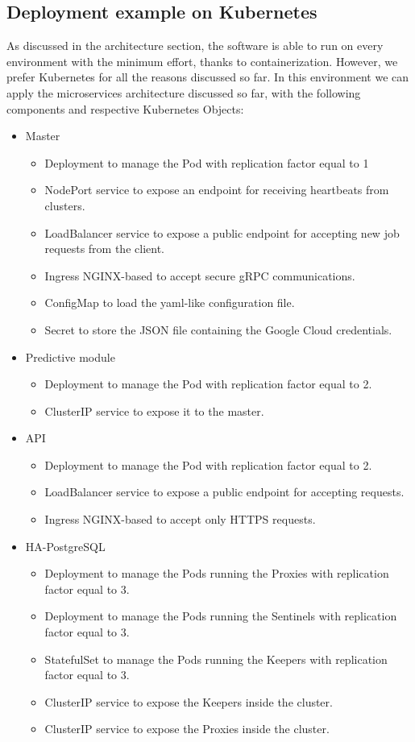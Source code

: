 \documentclass[12pt,twoside,cucitura]{toptesi}
\begin{document}
\subsection{Deployment example on Kubernetes}
As discussed in the architecture section, the software is able to run on every environment with the minimum effort, thanks to containerization. However, we prefer Kubernetes for all the reasons discussed so far. In this environment we can apply the microservices architecture discussed so far, with the following components and respective Kubernetes Objects:
\begin{itemize}
  \item Master
  \begin{itemize}
  	\item Deployment to manage the Pod with replication factor equal to 1
  	\item NodePort service to expose an endpoint for receiving heartbeats from clusters.
  	\item LoadBalancer service to expose a public endpoint for accepting new job requests from the client.
  	\item Ingress NGINX-based to accept secure gRPC communications.
  	\item ConfigMap to load the yaml-like configuration file.
  	\item Secret to store the JSON file containing the Google Cloud credentials.
  \end{itemize}
  \item Predictive module
  \begin{itemize}
     \item Deployment to manage the Pod with replication factor equal to 2.
     \item ClusterIP service to expose it to the master.
  \end{itemize}
  \item API
  \begin{itemize}
     \item Deployment to manage the Pod with replication factor equal to 2.
     \item LoadBalancer service to expose a public endpoint for accepting requests.
     \item Ingress NGINX-based to accept only HTTPS requests.
  \end{itemize}
  \item HA-PostgreSQL
  \begin{itemize}
     \item Deployment to manage the Pods running the Proxies with replication factor equal to 3.
     \item Deployment to manage the Pods running the Sentinels with replication factor equal to 3.
     \item StatefulSet to manage the Pods running the Keepers with replication factor equal to 3.
     \item ClusterIP service to expose the Keepers inside the cluster.
     \item ClusterIP service to expose the Proxies inside the cluster.
  \end{itemize}
\end{itemize}
\end{document}
